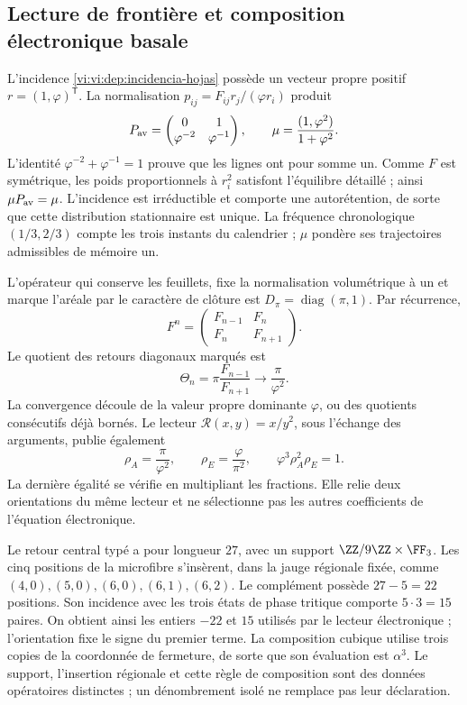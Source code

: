 \subsection{Lecture de frontière et composition électronique basale}
\label{vi:vi:dep:basal}

L’incidence \eqref{vi:vi:dep:incidencia-hojas} possède un vecteur propre
positif \(r=(1,\varphi)^{\mathsf T}\). La normalisation
\(p_{ij}=F_{ij}r_j/(\varphi r_i)\) produit
\[
 P_{\rm av}=\begin{pmatrix}0&1\\\varphi^{-2}&\varphi^{-1}\end{pmatrix},
 \qquad \mu=\frac{(1,\varphi^2)}{1+\varphi^2}.
\]
L’identité \(\varphi^{-2}+\varphi^{-1}=1\) prouve que les lignes
ont pour somme un. Comme \(F\) est symétrique, les poids proportionnels à
\(r_i^2\) satisfont l’équilibre détaillé ; ainsi \(\mu P_{\rm av}=\mu\).
L’incidence est irréductible et comporte une autorétention, de sorte que
cette distribution stationnaire est unique. La fréquence chronologique
\((1/3,2/3)\) compte les trois instants du calendrier ; \(\mu\)
pondère ses trajectoires admissibles de mémoire un.

L’opérateur qui conserve les feuillets, fixe la normalisation volumétrique
à un et marque l’aréale par le caractère de clôture est
\(D_\pi=\operatorname{diag}(\pi,1)\). Par récurrence,
\[
 F^n=\begin{pmatrix}F_{n-1}&F_n\\F_n&F_{n+1}\end{pmatrix}.
\]
Le quotient des retours diagonaux marqués est
\[
 \Theta_n=\pi\frac{F_{n-1}}{F_{n+1}}
 \longrightarrow\frac{\pi}{\varphi^2}.
\]
La convergence découle de la valeur propre dominante \(\varphi\), ou des
quotients consécutifs déjà bornés. Le lecteur
\(\mathcal R(x,y)=x/y^2\), sous l'échange des arguments,
publie également
\begin{equation}
 \rho_A=\frac{\pi}{\varphi^2},\qquad
 \rho_E=\frac{\varphi}{\pi^2},\qquad
 \varphi^3\rho_A^2\rho_E=1.
 \label{vi:vi:dep:dos-orientaciones}
\end{equation}
La dernière égalité se vérifie en multipliant les fractions.
Elle relie deux orientations du même lecteur et ne sélectionne pas les
autres coefficients de l’équation électronique.

Le retour central typé a pour longueur \(27\), avec un support
\(\ZZ/9\ZZ\times\FF_3\). Les cinq positions de la microfibre
s’insèrent, dans la jauge régionale fixée, comme
\((4,0),(5,0),(6,0),(6,1),(6,2)\).
Le complément possède \(27-5=22\) positions. Son incidence avec les
trois états de phase tritique comporte \(5\cdot3=15\) paires.
On obtient ainsi les entiers \(-22\) et \(15\) utilisés par le
lecteur électronique ; l’orientation fixe le signe du premier terme.
La composition cubique utilise trois copies de la coordonnée de fermeture,
de sorte que son évaluation est \(\alpha^3\). Le support, l’insertion
régionale et cette règle de composition sont des données opératoires distinctes ;
un dénombrement isolé ne remplace pas leur déclaration.

